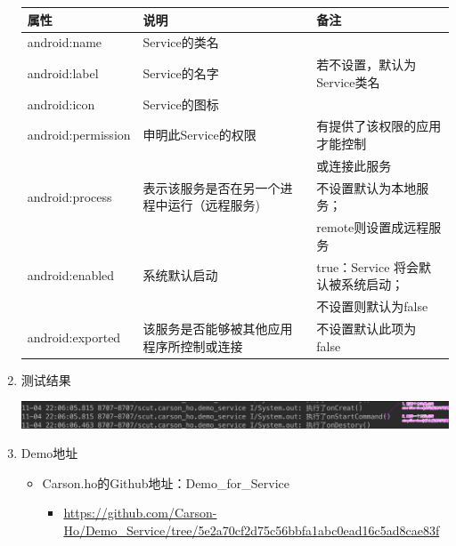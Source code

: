 \documentclass[9pt, b5paper]{article}
\begin{document}
\begin{enumerate}
\begin{center}
\begin{tabular}{lll}
\hline
属性 & 说明 & 备注\\
\hline
android:name & Service的类名 & \\
android:label & Service的名字 & 若不设置，默认为Service类名\\
android:icon & Service的图标 & \\
\hline
android:permission & 申明此Service的权限 & 有提供了该权限的应用才能控制\\
 &  & 或连接此服务\\
\hline
android:process & 表示该服务是否在另一个进程中运行（远程服务) & 不设置默认为本地服务；\\
 &  & remote则设置成远程服务\\
\hline
android:enabled & 系统默认启动 & true：Service 将会默认被系统启动；\\
 &  & 不设置则默认为false\\
\hline
android:exported & 该服务是否能够被其他应用程序所控制或连接 & 不设置默认此项为 false\\
\hline
\end{tabular}
\end{center}

\item 测试结果
\label{sec-3-4-1-3}

\includegraphics[width=.9\linewidth]{./pic/log.png}
\item Demo地址
\label{sec-3-4-1-4}
\begin{itemize}
\item Carson.ho的Github地址：Demo\_for\_Service
\begin{itemize}
\item \url{https://github.com/Carson-Ho/Demo_Service/tree/5e2a70cf2d75c56bbfa1abc0ead16c5ad8cae83f}
\end{itemize}
\end{itemize}
\end{enumerate}
\end{document}
